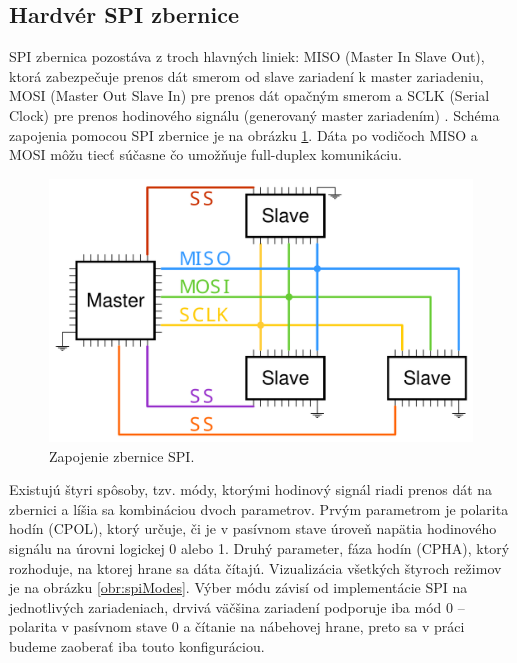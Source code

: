\subsection{Hardvér SPI zbernice}
SPI zbernica pozostáva z troch hlavných liniek: MISO (Master In Slave Out), ktorá zabezpečuje prenos dát smerom od slave zariadení k master zariadeniu, MOSI (Master Out Slave In) pre prenos dát opačným smerom a SCLK (Serial Clock) pre prenos hodinového signálu (generovaný master zariadením) \cite{spiBus}. Schéma zapojenia pomocou SPI zbernice je na obrázku \ref{obr:spiWiring}. Dáta po vodičoch MISO a MOSI môžu tiecť súčasne čo umožňuje full-duplex komunikáciu.

\begin{figure}
    \centerline{\includegraphics[width=1\textwidth]{images/spiWiring.pdf}}
    \caption[Zapojenie zbernice SPI]{Zapojenie zbernice SPI.}
    \label{obr:spiWiring}
\end{figure}

Existujú štyri spôsoby, tzv. módy, ktorými hodinový signál riadi prenos dát na zbernici a líšia sa kombináciou dvoch parametrov. Prvým parametrom je polarita hodín (CPOL), ktorý určuje, či je v pasívnom stave úroveň napätia hodinového signálu na úrovni logickej 0 alebo 1. Druhý parameter, fáza hodín (CPHA), ktorý rozhoduje, na ktorej hrane sa dáta čítajú. Vizualizácia všetkých štyroch režimov je na obrázku \ref{obr:spiModes}. Výber módu závisí od implementácie SPI na jednotlivých zariadeniach, drvivá väčšina zariadení podporuje iba mód 0 -- polarita v pasívnom stave 0 a čítanie na nábehovej hrane, preto sa v práci budeme zaoberať iba touto konfiguráciou.

